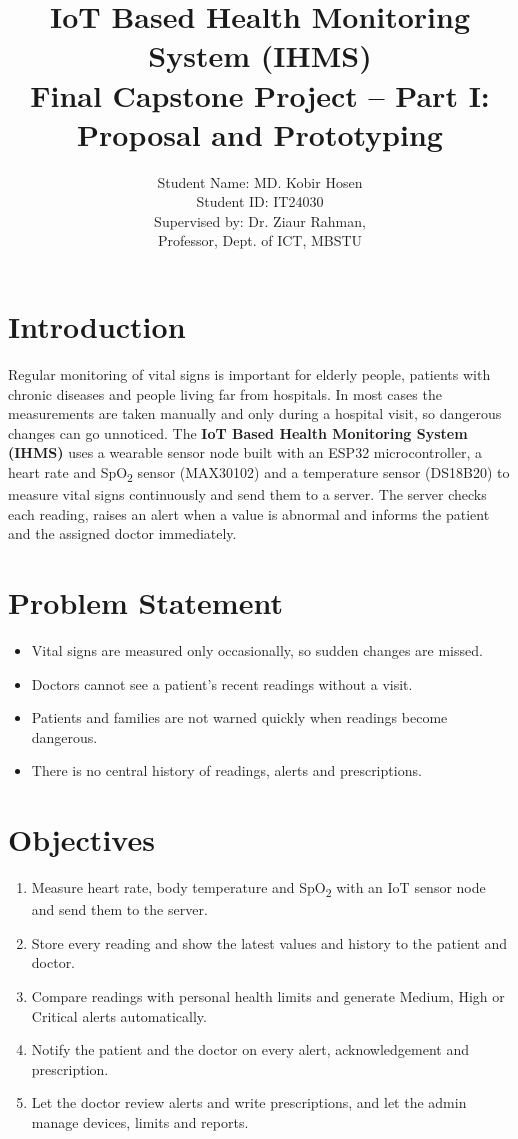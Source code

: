 \documentclass[12pt,a4paper]{article}
\title{\textbf{IoT Based Health Monitoring System (IHMS)}\\[4pt]
\large Final Capstone Project -- Part I: Proposal and Prototyping}
\author{Student Name: MD. Kobir Hosen \\ Student ID: IT24030 \\[6pt] Supervised by: Dr. Ziaur Rahman, \\ Professor, Dept. of ICT, MBSTU}
\date{}
\begin{document}
\maketitle
\tableofcontents
\newpage

\section{Introduction}
Regular monitoring of vital signs is important for elderly people, patients with chronic diseases and people living far from hospitals. In most cases the measurements are taken manually and only during a hospital visit, so dangerous changes can go unnoticed. The \textbf{IoT Based Health Monitoring System (IHMS)} uses a wearable sensor node built with an ESP32 microcontroller, a heart rate and SpO\textsubscript{2} sensor (MAX30102) and a temperature sensor (DS18B20) to measure vital signs continuously and send them to a server. The server checks each reading, raises an alert when a value is abnormal and informs the patient and the assigned doctor immediately.

\section{Problem Statement}
\begin{itemize}[noitemsep]
  \item Vital signs are measured only occasionally, so sudden changes are missed.
  \item Doctors cannot see a patient's recent readings without a visit.
  \item Patients and families are not warned quickly when readings become dangerous.
  \item There is no central history of readings, alerts and prescriptions.
\end{itemize}

\section{Objectives}
\begin{enumerate}[noitemsep]
  \item Measure heart rate, body temperature and SpO\textsubscript{2} with an IoT sensor node and send them to the server.
  \item Store every reading and show the latest values and history to the patient and doctor.
  \item Compare readings with personal health limits and generate Medium, High or Critical alerts automatically.
  \item Notify the patient and the doctor on every alert, acknowledgement and prescription.
  \item Let the doctor review alerts and write prescriptions, and let the admin manage devices, limits and reports.
\end{enumerate}
\end{document}

